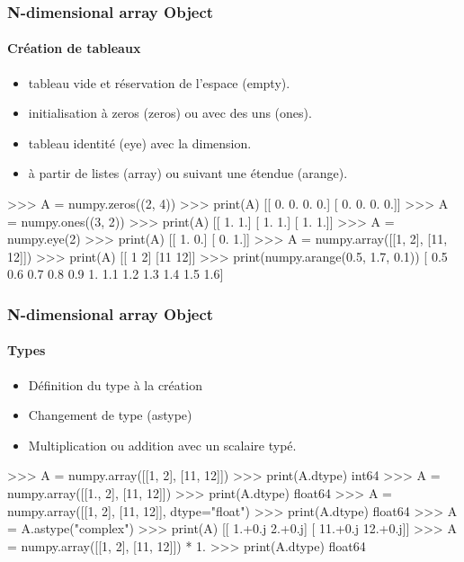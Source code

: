 \begin{frame}[fragile]
\frametitle{N-dimensional array Object}
\framesubtitle{Création de tableaux}
\begin{itemize}
 \item tableau vide et réservation de l'espace (empty).
 \item initialisation à zeros (zeros) ou avec des uns (ones).
 \item tableau identité (eye) avec la dimension.
 \item à partir de listes (array) ou suivant une étendue (arange).
\end{itemize}
\begin{pythonConsole}
>>> A = numpy.zeros((2, 4))
>>> print(A)
[[ 0.  0.  0.  0.]
 [ 0.  0.  0.  0.]]
>>> A = numpy.ones((3, 2))
>>> print(A)
[[ 1.  1.]
 [ 1.  1.]
 [ 1.  1.]]
>>> A = numpy.eye(2)
>>> print(A)
[[ 1.  0.]
 [ 0.  1.]]
>>> A = numpy.array([[1, 2], [11, 12]])
>>> print(A)
[[ 1  2]
 [11 12]]
>>> print(numpy.arange(0.5, 1.7, 0.1))
[ 0.5  0.6  0.7  0.8  0.9  1.   1.1  1.2  1.3  1.4  1.5  1.6]
\end{pythonConsole}
\end{frame}
\begin{frame}[fragile]
\frametitle{N-dimensional array Object}
\framesubtitle{Types}
\begin{itemize}
 \item Définition du type à la création
 \item Changement de type (astype)
 \item Multiplication ou addition avec un scalaire typé. 
\end{itemize}
\begin{pythonConsole}
>>> A = numpy.array([[1, 2], [11, 12]])
>>> print(A.dtype)
int64
>>> A = numpy.array([[1., 2], [11, 12]])
>>> print(A.dtype)
float64
>>> A = numpy.array([[1, 2], [11, 12]], dtype="float")
>>> print(A.dtype)
float64
>>> A = A.astype("complex")
>>> print(A)
[[  1.+0.j   2.+0.j]
 [ 11.+0.j  12.+0.j]]
>>> A = numpy.array([[1, 2], [11, 12]]) * 1.
>>> print(A.dtype)
float64
\end{pythonConsole}
\end{frame}
